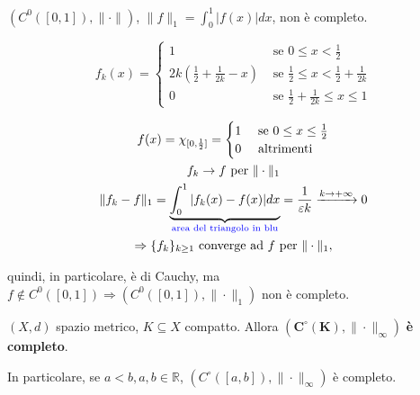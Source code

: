 \begin{exbar}
\begin{example}
	$(C^0([0,1]), \|\cdot \|)$, $\| f \|_1 = \int_{0}^{1} |f(x)|dx$, non è completo.
	
	$$f_k(x)= 
	\begin{cases}
		1 & \text{ se } 0 \leq x < \frac{1}{2} 
		\\
		2k \left(\frac{1}{2}+\frac{1}{2k}-x\right) & \text{ se } \frac{1}{2} \leq x <  \frac{1}{2} + \frac{1}{2k}
		\\
		0 & \text{ se } \frac{1}{2}+ \frac{1}{2k} \leq x \leq 1
	\end{cases}$$
	
	\segnaposto
	
	\begin{gather*} 
		f(x) = \chi_{[0, \frac{1}{2}]} = 
		\begin{cases}
			1 & \text{ se } 0 \leq x \leq \frac{1}{2}
			\\
			0 & \text{ altrimenti}
		\end{cases}
		\\
		f_k \rightarrow f \text{ per } \|\cdot\|_1
		\\
		\|f_k-f\|_1= \underbrace{\int_{0}^{1}|f_k(x)-f(x)|dx}_{\color{blue}{\text{area del triangolo in blu}}} = \frac{1}{\epsilon k} \xrightarrow{k \rightarrow +\infty} 0
		\\
		\Rightarrow \{f_k\}_{k \geq 1} \text{ converge ad $f$ per } \|\cdot \|_1,
	\end{gather*} 
	
	quindi, in particolare, è di Cauchy, ma $ f \notin C^0([0,1]) \Rightarrow (C^0([0,1]),\|\cdot\|_1)$ non è completo.
\end{example}
\end{exbar}


\begin{theorem}
	\label{th: pag 231}
	$(X,d)$ spazio metrico, $K \subseteq X$ compatto. Allora $\mathbf{(C^\circ(K), \|\cdot\|_\infty)}$ \textbf{è completo}.
	
	In particolare, se $a < b, a, b \in \mathbb{R}$, $(C^\circ([a,b]),\|\cdot\|_\infty)$ è completo.
\end{theorem}


